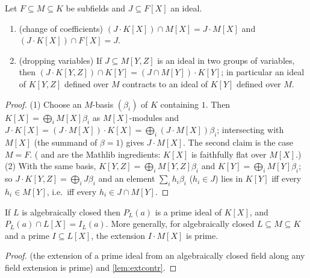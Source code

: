 \begin{lemma}\label{lem:extcontr}
Let $F\subseteq M\subseteq K$ be subfields and $J\subseteq F[X]$ an ideal.
\begin{enumerate}[nosep]
\item (change of coefficients) $(J\cdot K[X])\cap M[X]=J\cdot M[X]$ and
  $(J\cdot K[X])\cap F[X]=J$.
\item (dropping variables) If $J\subseteq M[Y,Z]$ is an ideal in two groups of variables,
  then $(J\cdot K[Y,Z])\cap K[Y]=(J\cap M[Y])\cdot K[Y]$; in particular an ideal of
  $K[Y,Z]$ defined over $M$ contracts to an ideal of $K[Y]$ defined over $M$.
\end{enumerate}
\end{lemma}
\begin{proof}
(1) Choose an $M$-basis $(\beta_i)$ of $K$ containing $1$.  Then $K[X]=\bigoplus_i M[X]\beta_i$
as $M[X]$-modules and $J\cdot K[X]=(J\cdot M[X])\cdot K[X]=\bigoplus_i (J\cdot M[X])\beta_i$;
intersecting with $M[X]$ (the summand of $\beta=1$) gives $J\cdot M[X]$.  The second
claim is the case $M=F$.  ( and
 are the Mathlib ingredients:
$K[X]$ is faithfully flat over $M[X]$.)
(2) With the same basis, $K[Y,Z]=\bigoplus_i M[Y,Z]\beta_i$ and
$K[Y]=\bigoplus_i M[Y]\beta_i$; so $J\cdot K[Y,Z]=\bigoplus_i J\beta_i$ and an element
$\sum_i h_i\beta_i$ ($h_i\in J$) lies in $K[Y]$ iff every $h_i\in M[Y]$, i.e.\ iff every
$h_i\in J\cap M[Y]$.
\end{proof}

\begin{lemma}\label{lem:locusprime}
If $L$ is algebraically closed then $P_L(a)$ is a prime ideal of $K[X]$, and
$P_L(a)\cap L[X]=I_L(a)$.  More generally, for algebraically closed $L\subseteq M\subseteq K$
and a prime $I\subseteq L[X]$, the extension $I\cdot M[X]$ is prime.
\end{lemma}
\begin{proof}
 (the extension of a prime ideal from an
algebraically closed field along any field extension is prime) and
\cref{lem:extcontr}.
\end{proof}

